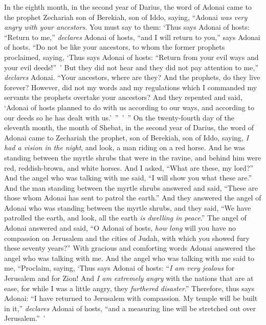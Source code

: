 
\begin{biblechapter} %
\verse In the eighth month, in the second year of Darius, the word of Adonai came to the prophet Zechariah son of Berekiah, son of Iddo, saying,
\verse “Adonai \textit{was very angry with your ancestors}.
\verse You must say to them: ‘Thus says Adonai of hosts: “Return to me,” \textit{declares} Adonai of hosts, “and I will return to you,” says Adonai of hosts.
\verse “Do not be like your ancestors, to whom the former prophets proclaimed, saying, ‘Thus says Adonai of hosts: “Return from your evil ways and your evil deeds!” ’ But they did not hear and they did not pay attention to me,” \textit{declares} Adonai.
\verse “Your ancestors, where are they? And the prophets, do they live forever?
\verse However, did not my words and my regulations which I commanded my servants the prophets overtake your ancestors? And they repented and said, ‘Adonai of hosts planned to do with us according to our ways, and according to our deeds so he has dealt with us.’ ” ’ ”
 On the twenty-fourth day of the eleventh month, the month of Shebat, in the second year of Darius, the word of Adonai came to Zechariah the prophet, son of Berekiah, son of Iddo, saying,
\verse \textit{I had a vision in the night}, and look, a man riding on a red horse. And he was standing between the myrtle shrubs that were in the ravine, and behind him were red, reddish-brown, and white horses.
\verse And I asked, “What are these, my lord?” And the angel who was talking with me said, “I will show you what these are.”
\verse And the man standing between the myrtle shrubs answered and said, “These are those whom Adonai has sent to patrol the earth.”
\verse And they answered the angel of Adonai who was standing between the myrtle shrubs, and they said, “We have patrolled the earth, and look, all the earth \textit{is dwelling in peace}.”
\verse The angel of Adonai answered and said, “O Adonai of hosts, \textit{how long} will you have no compassion on Jerusalem and the cities of Judah, with which you showed fury these seventy years?”
\verse With gracious and comforting words Adonai answered the angel who was talking with me.
\verse And the angel who was talking with me said to me, “Proclaim, saying, ‘Thus says Adonai of hosts: “\textit{I am very jealous} for Jerusalem and for Zion!
\verse And \textit{I am extremely angry} with the nations that are at ease, for while I was a little angry, they \textit{furthered disaster}.”
\verse Therefore, thus says Adonai: “I have returned to Jerusalem with compassion. My temple will be built in it,” \textit{declares} Adonai of hosts, “and a measuring line will be stretched out over Jerusalem.” ’

\end{biblechapter}
